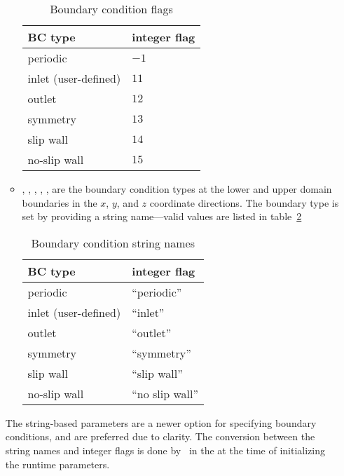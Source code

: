 \begin{itemize}
\begin{itemize}
   \begin{table}[h]
   \caption{\label{gs:table:bcflags} Boundary condition flags}  
   \begin{center}
   \begin{tabular}{ll}
   \hline
   BC type    & integer flag \\
   \hline
   periodic             & $-1$ \\
   inlet (user-defined) & $11$ \\
   outlet               & $12$ \\
   symmetry             & $13$ \\
   slip wall            & $14$ \\
   no-slip wall         & $15$ \\
   \hline
   \end{tabular}
   \end{center}
   \end{table}

   \item {}, , , , , 
   are the boundary condition types at the lower and upper domain
   boundaries in the $x$, $y$, and $z$ coordinate directions.  The
   boundary type is set by providing a string name---valid values are
   listed in table~\ref{gs:table:bcstrings}

   \begin{table}[h]
   \caption{\label{gs:table:bcstrings} Boundary condition string names}  
   \begin{center}
   \begin{tabular}{ll}
   \hline
   BC type    & integer flag \\
   \hline
   periodic             & ``periodic'' \\
   inlet (user-defined) & ``inlet'' \\
   outlet               & ``outlet'' \\
   symmetry             & ``symmetry'' \\
   slip wall            & ``slip wall'' \\
   no-slip wall         & ``no slip wall'' \\
   \hline
   \end{tabular}
   \end{center}
   \end{table}

   \end{itemize}

  The string-based parameters are a newer option for specifying
  boundary conditions, and are preferred due to clarity.  The
  conversion between the string names and integer flags is done
  by \boxlib\ in the  at the time of initializing
  the runtime parameters.

\end{itemize}

